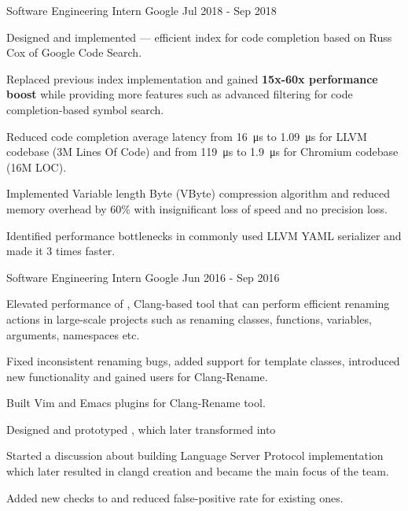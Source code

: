 \begin{cventries}
  \cventry
    {Software Engineering Intern}
    {Google}
    {}
    {Jul 2018 - Sep 2018}
    {
      \begin{cvitems}
        \item Designed and implemented
          --- efficient index for code completion
          based on Russ Cox
           of Google
          Code Search.
        \item Replaced previous index implementation and gained
          \textbf{15x-60x performance boost} while providing more features such
          as advanced filtering for code completion-based symbol search.
        \item Reduced code completion average latency from \SI{16}{\us} to
          \SI{1.09}{\us} for LLVM codebase (3M Lines Of Code) and from
          \SI{119}{\us} to \SI{1.9}{\us} for Chromium codebase (16M LOC).
        \item Implemented Variable length Byte (VByte) compression algorithm
          and reduced memory overhead by 60\% with insignificant loss of speed
          and no precision loss.
        \item Identified performance bottlenecks in commonly used LLVM YAML
          serializer and made it 3 times faster.
      \end{cvitems}
    }

  \cventry
    {Software Engineering Intern}
    {Google}
    {}
    {Jun 2016 - Sep 2016}
    {
      \begin{cvitems}
        \item Elevated performance of
          ,
          Clang-based tool that can perform efficient renaming actions in
          large-scale projects such as renaming classes, functions, variables,
          arguments, namespaces etc.
        \item Fixed inconsistent renaming bugs, added support for template
          classes, introduced new functionality and gained users for
          Clang-Rename.
        \item Built Vim and Emacs plugins for Clang-Rename tool.
        \item Designed and prototyped
          ,
          which later transformed into 
        \item Started a discussion about building Language Server Protocol
          implementation which later resulted in clangd creation and became the
          main focus of the team.
        \item Added new checks to
           and
          reduced false-positive rate for existing ones.
      \end{cvitems}
    }


\end{cventries}
